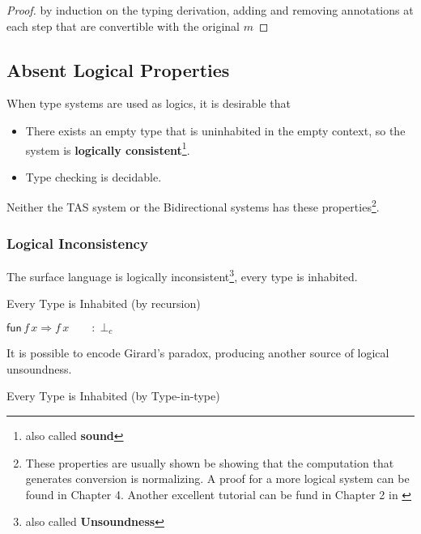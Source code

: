 \begin{proof}
by induction on the typing derivation, adding and removing annotations
at each step that are convertible with the original $m$
\end{proof}

\subsection{Absent Logical Properties}

When type systems are used as logics, it is desirable that
\begin{itemize}
\item There exists an empty type that is uninhabited in the empty context,
so the system is \textbf{logically consistent}\footnote{also called \textbf{sound}}.
\item Type checking is decidable.
\end{itemize}
Neither the TAS system or the Bidirectional systems has these properties\footnote{These properties are usually shown be showing that the computation
that generates conversion is normalizing. A proof for a more logical
system can be found in Chapter 4\cite{luo1994computation}. Another
excellent tutorial can be fund in Chapter 2 in \cite{casinghino2014combiningthesis}}. %

\subsubsection{Logical Inconsistency}

The surface language is logically inconsistent\footnote{also called \textbf{Unsoundness}},
every type is inhabited. 

\begin{example}
Every Type is Inhabited (by recursion)

$\mathsf{fun}\,f\,x\Rightarrow f\,x\qquad:\perp_{c}$
\end{example}

It is possible to encode Girard's paradox, producing another source
of logical unsoundness. 
\begin{example}
Every Type is Inhabited (by Type-in-type)


\end{example}

